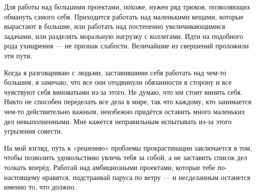 \documentclass[ebook,12pt,oneside,openany]{memoir}
\begin{document}
Для работы над большими проектами, похоже, нужен ряд трюков,
позволяющих обмануть самого себя. Приходится работать над маленькими
вещами, которые вырастают в большие, или работать над постепенно
увеличивающимися задачами, или разделять моральную нагрузку с
коллегами. Идти на подобного рода ухищрения — не признак слабости.
Величайшие из свершений проложили эти пути.

Когда я разговариваю с людьми, заставившими себя работать над чем-то
большим, я замечаю, что все они отодвинули обязанности в сторону и все
чувствуют себя виноватыми из-за этого. Не думаю, что им стоит винить
себя. Никто не способен переделать все дела в мире, так что каждому,
кто занимается чем-то действительно важным, неизбежно придётся
оставить много маленьких дел невыполненными. Мне кажется неправильным
испытывать из-за этого угрызения совести.

На мой взгляд, путь к «решению» проблемы прокрастинации заключается в
том, чтобы позволить удовольствию увлечь тебя за собой, а не заставить
список дел толкать вперёд. Работай над амбициозными проектами, которые
тебе по-настоящему нравятся, подстраивай паруса по ветру — и
несделанным останется именно то, что должно.
\end{document}
